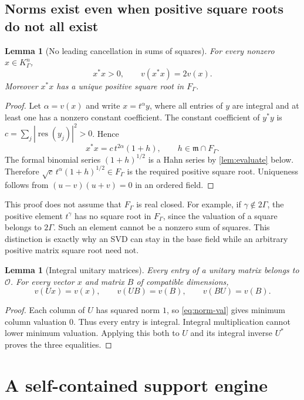 \documentclass[11pt,letterpaper]{article}
\numberwithin{equation}{section}
\newtheorem{lemma}[theorem]{Lemma}
\theoremstyle{definition}
\theoremstyle{remark}
\newcommand{\OO}{\mathcal O}
\newcommand{\mm}{\mathfrak m}
\newcommand{\res}{\operatorname{res}}
\newcommand{\KG}{K_{\Gamma}}
\newcommand{\FG}{F_{\Gamma}}
\begin{document}
\subsection{Norms exist even when positive square roots do not all exist}

\begin{lemma}[No leading cancellation in sums of squares]\label{lem:norm}
For every nonzero $x\in\KG^n$,
\begin{equation}\label{eq:norm-val}
 x^*x>0,\qquad v(x^*x)=2v(x).
\end{equation}
Moreover $x^*x$ has a unique positive square root in $\FG$.
\end{lemma}

\begin{proof}
Let $\alpha=v(x)$ and write $x=t^\alpha y$, where all entries of $y$ are
integral and at least one has a nonzero constant coefficient. The constant
coefficient of $y^*y$ is $c=\sum_j|\res(y_j)|^2>0$. Hence
\[
 x^*x=c\,t^{2\alpha}(1+h),\qquad h\in\mm\cap\FG.
\]
The formal binomial series $(1+h)^{1/2}$ is a Hahn series by
\cref{lem:evaluate} below. Therefore
$\sqrt c\,t^\alpha(1+h)^{1/2}\in\FG$ is the required positive square root.
Uniqueness follows from $(u-v)(u+v)=0$ in an ordered field.
\end{proof}

This proof does not assume that $\FG$ is real closed. For example, if
$\gamma\notin2\Gamma$, the positive element $t^\gamma$ has no square root in
$\FG$, since the valuation of a square belongs to $2\Gamma$. Such an element
cannot be a nonzero sum of squares. This distinction is exactly why an SVD
can stay in the base field while an arbitrary positive matrix square root
need not.

\begin{lemma}[Integral unitary matrices]\label{lem:unitary}
Every entry of a unitary matrix belongs to $\OO$. For every vector $x$ and
matrix $B$ of compatible dimensions,
\[
 v(Ux)=v(x),\qquad v(UB)=v(B),\qquad v(BU)=v(B).
\]
\end{lemma}
\begin{proof}
Each column of $U$ has squared norm $1$, so \cref{eq:norm-val} gives minimum
column valuation $0$. Thus every entry is integral. Integral multiplication
cannot lower minimum valuation. Applying this both to $U$ and its integral
inverse $U^*$ proves the three equalities.
\end{proof}

\section{A self-contained support engine}
\label{sec:support}
\end{document}
